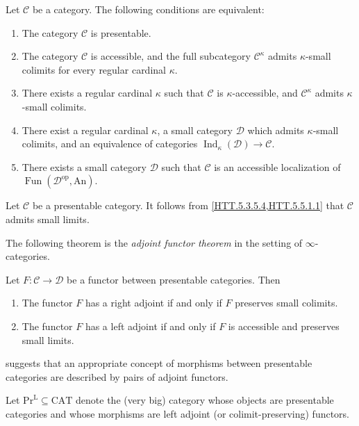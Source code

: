 \documentclass[a4paper,dvipdfmx,11pt,reqno]{amsart}
\DeclareMathOperator{\myop}{op}
\DeclareMathOperator{\Fun}{Fun}
\DeclareMathOperator{\Ind}{Ind}
\newcommand{\C}{\mathcal{C}}
\newcommand{\D}{\mathcal{D}}
\newcommand{\An}{\mathrm{An}}
\newcommand{\CAT}{\mathrm{CAT}}
\newcommand{\PrL}{\mathrm{Pr}^{\mathrm{L}}}
\begin{document}
\begin{theorem} \label{HTT.5.5.1.1}
  Let $\C$ be a category.
  The following conditions are equivalent:
  \begin{enumerate}
    \item The category $\C$ is presentable.
    \item The category $\C$ is accessible, and the full subcategory $\C^{\kappa}$ admits $\kappa$-small colimits for every regular cardinal $\kappa$.
    \item There exists a regular cardinal $\kappa$ such that $\C$ is $\kappa$-accessible, and $\C^{\kappa}$ admits $\kappa$-small colimits.
    \item There exist a regular cardinal $\kappa$, a small category $\D$ which admits $\kappa$-small colimits, and an equivalence of categories $\Ind_{\kappa}(\D) \to \C$.
    \item There exists a small category $\D$ such that $\C$ is an accessible localization of $\Fun(\D^{\myop},\An)$.
  \end{enumerate}
\end{theorem}

\begin{remark}
  Let $\C$ be a presentable category.
  It follows from \cref{HTT.5.3.5.4,HTT.5.5.1.1} that $\C$ admits small limits.  
\end{remark}

The following theorem is the \textit{adjoint functor theorem} in the setting of $\infty$-categories.

\begin{theorem} \label{HTT.5.5.2.9}
  Let $F : \C \to \D$ be a functor between presentable categories. 
  Then
  \begin{enumerate}
    \item The functor $F$ has a right adjoint if and only if $F$ preserves small colimits.
    \item The functor $F$ has a left adjoint if and only if $F$ is accessible and preserves small limits.
  \end{enumerate}
\end{theorem}

 suggests that an appropriate concept of morphisms between presentable categories are described by pairs of adjoint functors.

\begin{definition}
  Let $\PrL \subseteq \CAT$ denote the (very big) category whose objects are presentable categories and whose morphisms are left adjoint (or colimit-preserving) functors.
\end{definition}
\end{document}
